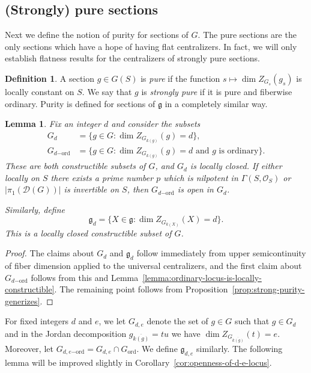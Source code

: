 \documentclass[11pt,reqno]{amsart}
\newtheorem{lemma}[theorem]{Lemma}
\theoremstyle{definition}
\newtheorem{definition}[theorem]{Definition}
\renewcommand{\rm}{\mathrm}
\newcommand{\sD}{{\mathscr D}}
\newcommand{\sO}{{\mathscr O}}
\newcommand{\fg}{\mathfrak{g}}
\begin{document}
\subsection{(Strongly) pure sections}\label{subsection:pure}

Next we define the notion of purity for sections of $G$. The pure sections are the only sections which have a hope of having flat centralizers. In fact, we will only establish flatness results for the centralizers of strongly pure sections. 

\begin{definition}\label{definition:pure-and-strongly-pure}
A section $g \in G(S)$ is \textit{pure} if the function $s \mapsto \dim Z_{G_s}(g_s)$ is locally constant on $S$. We say that $g$ is \textit{strongly pure} if it is pure and fiberwise ordinary. Purity is defined for sections of $\fg$ in a completely similar way.
\end{definition}

\begin{lemma}\label{lemma:locus-of-d-dimensional-centralizer}
Fix an integer $d$ and consider the subsets
\begin{align*}
G_d &= \{g \in G: \dim Z_{G_{k(g)}}(g) = d\}, \\
G_{d\rm{-ord}} &= \{g \in G: \dim Z_{G_{k(g)}}(g) = d \text{ and } g \text{ is ordinary}\}.
\end{align*}
These are both constructible subsets of $G$, and $G_d$ is locally closed. If either locally on $S$ there exists a prime number $p$ which is nilpotent in $\Gamma(S, \sO_S)$ or $|\pi_1(\sD(G))|$ is invertible on $S$, then $G_{d\rm{-ord}}$ is open in $G_d$.

Similarly, define
\[
\fg_d = \{X \in \fg: \dim Z_{G_{k(X)}}(X) = d\}.
\]
This is a locally closed constructible subset of $G$.
\end{lemma}

\begin{proof}
The claims about $G_d$ and $\fg_d$ follow immediately from upper semicontinuity of fiber dimension \cite[IV\textsubscript{3}, Thm.\ 13.1.3]{EGA} applied to the universal centralizers, and the first claim about $G_{d\rm{-ord}}$ follows from this and Lemma~\ref{lemma:ordinary-locus-is-locally-constructible}. The remaining point follows from Proposition~\ref{prop:strong-purity-generizes}.
\end{proof}

For fixed integers $d$ and $e$, we let $G_{d, e}$ denote the set of $g \in G$ such that $g \in G_d$ and in the Jordan decomposition $g_{\overline{k(g)}} = tu$ we have $\dim Z_{G_{\overline{k(g)}}}(t) = e$. Moreover, let $G_{d, e\rm{-ord}} = G_{d, e} \cap G_{\rm{ord}}$. We define $\fg_{d, e}$ similarly. The following lemma will be improved slightly in Corollary~\ref{cor:openness-of-d-e-locus}.
\end{document}
